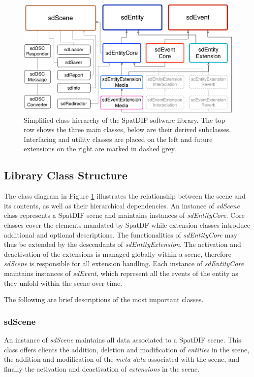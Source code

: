 \documentclass{article}
\begin{document}
\begin{figure}[bh]
	\centering
	\includegraphics[width=\columnwidth]{class_diagram.pdf}
	\caption{Simplified class hierarchy of the SpatDIF software library. The top row shows the three main classes, below are their derived subclasses. Interfacing and utility classes are placed on the left and future extensions on the right are marked in dashed grey.}
	\label{fig:class_structure}
\end{figure}

\subsection{Library Class Structure}\label{subsec:class_structure}

The class diagram in Figure \ref{fig:class_structure} illustrates the relationship between the scene and its contents, as well as their hierarchical dependencies.
An instance of \emph{sdScene} class represents a SpatDIF scene and maintains instances of \emph{sdEntityCore}.
Core classes cover the elements mandated by SpatDF while extension classes introduce additional and optional descriptions.
The functionalities of \emph{sdEntityCore} may thus be extended by the descendants of \emph{sdEntityExtension}. 
The activation and deactivation of the extensions is managed globally within a scene, therefore \emph{sdScene} is responsible for all extension handling.
Each instance of \emph{sdEntityCore} maintains instances of \emph{sdEvent}, which represent all the events of the entity as they unfold within the scene over time.

The following are brief descriptions of the most important classes.


\subsubsection*{sdScene}
An instance of \emph{sdScene} maintains all data associated to a SpatDIF scene.
This class offers clients the addition, deletion and modification of \emph{entities} in the scene, the addition and modification of the \emph{meta data} associated with the scene, and finally the activation and deactivation of \emph{extensions} in the scene.
\end{document}
